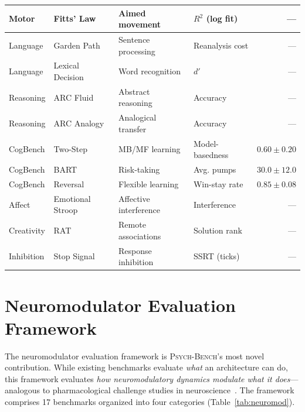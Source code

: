 \documentclass[11pt,letterpaper]{article}
\newcommand{\psychbench}{\textsc{Psych-Bench}}
\begin{document}
\begin{table}[p]
\begin{tabular}{@{}llllr@{}}
Motor & Fitts' Law & Aimed movement & $R^2$ (log fit) & --- \\
\midrule
Language & Garden Path & Sentence processing & Reanalysis cost & --- \\
Language & Lexical Decision & Word recognition & $d'$ & --- \\
\midrule
Reasoning & ARC Fluid & Abstract reasoning & Accuracy & --- \\
Reasoning & ARC Analogy & Analogical transfer & Accuracy & --- \\
\midrule
CogBench & Two-Step & MB/MF learning & Model-basedness & $0.60 \pm 0.20$ \\
CogBench & BART & Risk-taking & Avg. pumps & $30.0 \pm 12.0$ \\
CogBench & Reversal & Flexible learning & Win-stay rate & $0.85 \pm 0.08$ \\
\midrule
Affect & Emotional Stroop & Affective interference & Interference & --- \\
Creativity & RAT & Remote associations & Solution rank & --- \\
Inhibition & Stop Signal & Response inhibition & SSRT (ticks) & --- \\
\bottomrule
\end{tabular}
\end{table}

\section{Neuromodulator Evaluation Framework}
\label{sec:neuromod}

The neuromodulator evaluation framework is \psychbench{}'s most novel contribution. While existing benchmarks evaluate \emph{what} an architecture can do, this framework evaluates \emph{how neuromodulatory dynamics modulate what it does}---analogous to pharmacological challenge studies in neuroscience~\citep{doya2002metalearning}. The framework comprises 17 benchmarks organized into four categories (Table~\ref{tab:neuromod}).
\end{document}

